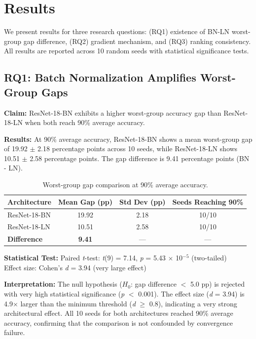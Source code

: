 \section{Results}

We present results for three research questions: (RQ1) existence of BN-LN worst-group gap difference, (RQ2) gradient mechanism, and (RQ3) ranking consistency. All results are reported across 10 random seeds with statistical significance tests.

\subsection{RQ1: Batch Normalization Amplifies Worst-Group Gaps}

\textbf{Claim:} ResNet-18-BN exhibits a higher worst-group accuracy gap than ResNet-18-LN when both reach 90\% average accuracy.

\textbf{Results:} At 90\% average accuracy, ResNet-18-BN shows a mean worst-group gap of 19.92 $\pm$ 2.18 percentage points across 10 seeds, while ResNet-18-LN shows 10.51 $\pm$ 2.58 percentage points. The gap difference is 9.41 percentage points (BN - LN).

\begin{table}[h]
\centering
\caption{Worst-group gap comparison at 90\% average accuracy.}
\label{tab:rq1_gaps}
\begin{tabular}{lccc}
\toprule
Architecture & Mean Gap (pp) & Std Dev (pp) & Seeds Reaching 90\% \\
\midrule
ResNet-18-BN & 19.92 & 2.18 & 10/10 \\
ResNet-18-LN & 10.51 & 2.58 & 10/10 \\
\textbf{Difference} & \textbf{9.41} & --- & --- \\
\bottomrule
\end{tabular}
\end{table}

\textbf{Statistical Test:}
Paired \emph{t}-test: \emph{t}(9) = 7.14, \emph{p} = 5.43 $\times$ 10$^{-5}$ (two-tailed) \\
Effect size: Cohen's \emph{d} = 3.94 (very large effect)

\textbf{Interpretation:} The null hypothesis ($H_0$: gap difference $<$ 5.0 pp) is rejected with very high statistical significance (\emph{p} $<$ 0.001). The effect size (\emph{d} = 3.94) is 4.9$\times$ larger than the minimum threshold (\emph{d} $\geq$ 0.8), indicating a very strong architectural effect. All 10 seeds for both architectures reached 90\% average accuracy, confirming that the comparison is not confounded by convergence failure.


